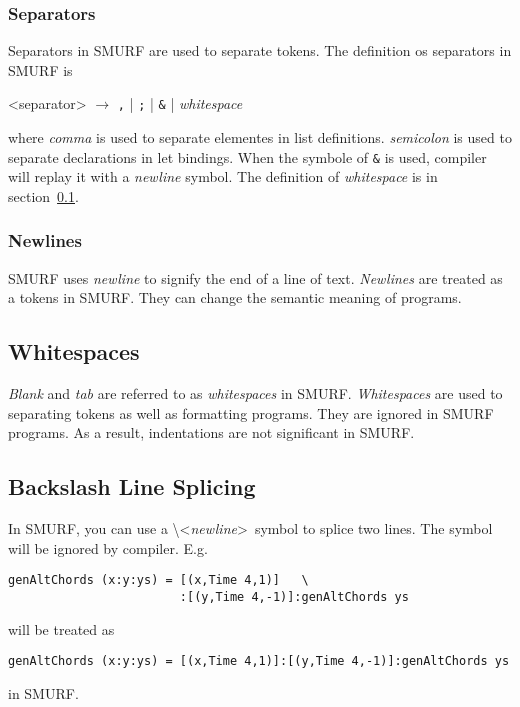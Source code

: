\subsubsection{Separators}
Separators in SMURF are used to separate tokens. The definition os separators in
SMURF is 

\begin{grammar}
<separator> $\rightarrow$ \texttt{,} | \texttt{;} | \texttt{\&} | \it{whitespace}
\end{grammar}

where {\it comma} is used to separate elementes in list definitions.
{\it semicolon} is used to separate declarations in let bindings. 
When the symbole of \texttt{\&} is used, compiler will replay it with a {\it newline} symbol.
The definition of {\it whitespace} is in section~\ref{sec:whitespaces}. 


\subsubsection{Newlines}
SMURF uses {\it newline} to signify the end of a line of text. {\it Newlines}
are treated as a tokens in SMURF. They can change the semantic meaning of programs.


\subsection{Whitespaces}
\label{sec:whitespaces}
{\it Blank} and {\it tab} are referred to as {\it whitespaces} in SMURF. 
{\it Whitespaces} are used to
separating tokens as well as formatting programs. They are ignored in
SMURF programs. As a result, indentations are not significant in SMURF.


\subsection{Backslash Line Splicing}
In SMURF, you can use a \textbackslash\textless{\it newline}\textgreater~{}symbol to splice two lines. The symbol
will be ignored by compiler. E.g.
\begin{lstlisting}
genAltChords (x:y:ys) = [(x,Time 4,1)]   \
                        :[(y,Time 4,-1)]:genAltChords ys
\end{lstlisting}
will be treated as 
\begin{lstlisting}
genAltChords (x:y:ys) = [(x,Time 4,1)]:[(y,Time 4,-1)]:genAltChords ys
\end{lstlisting}
in SMURF.
